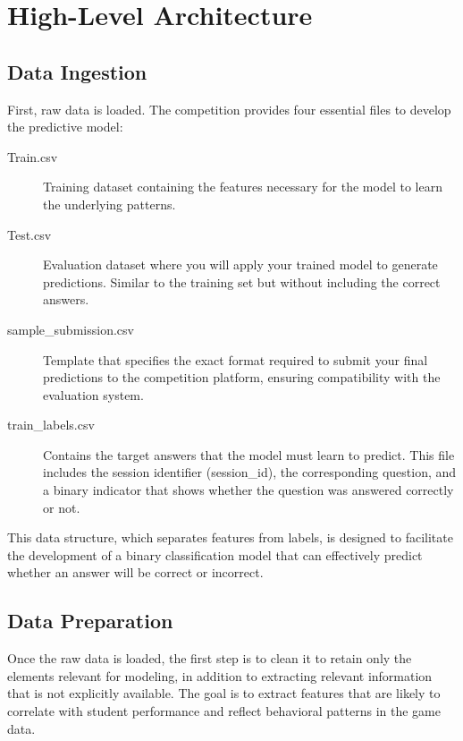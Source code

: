 \documentclass{article}
\begin{document}
\section{High-Level Architecture}
\subsection*{Data Ingestion}

First, raw data is loaded. The competition provides four essential files to develop the predictive model:

\begin{description}
  \item[Train.csv] Training dataset containing the features necessary for the model to learn the underlying patterns.
  
  \item[Test.csv] Evaluation dataset where you will apply your trained model to generate predictions. Similar to the training set but without including the correct answers.
  
  \item[sample\_submission.csv] Template that specifies the exact format required to submit your final predictions to the competition platform, ensuring compatibility with the evaluation system.
  
  \item[train\_labels.csv] Contains the target answers that the model must learn to predict. This file includes the session identifier (session\_id), the corresponding question, and a binary indicator that shows whether the question was answered correctly or not.
\end{description}

This data structure, which separates features from labels, is designed to facilitate the development of a binary classification model that can effectively predict whether an answer will be correct or incorrect.

\subsection*{Data Preparation}

Once the raw data is loaded, the first step is to clean it to retain only the elements relevant for modeling, in addition to extracting relevant information that is not explicitly available. The goal is to extract features that are likely to correlate with student performance and reflect behavioral patterns in the game data.
\end{document}
